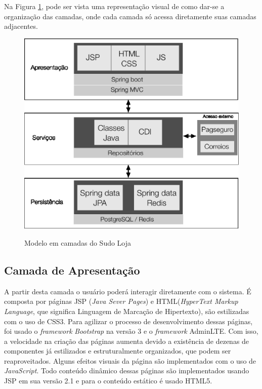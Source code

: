 \documentclass[a4paper,12pt]{monografia}
\begin{document}
Na Figura \ref{fig:representacao-pa}, pode ser vista uma representação visual de como dar-se a organização das camadas, onde cada camada só acessa diretamente suas camadas adjacentes.

\begin{figure}[H]
\centering
\caption{Modelo em camadas do Sudo Loja}
\centering
\includegraphics[scale=0.7]{img/representacao-pa.eps}\\
\label{fig:representacao-pa}
\end{figure}

\subsection{Camada de Apresentação} %
\label{sub:camada_de_apresentacao}

A partir desta camada o usuário poderá interagir diretamente com o sistema. É composta por páginas JSP (\textit{Java Sever Pages}) e HTML(\textit{HyperText Markup Language}, que significa Linguagem de Marcação de Hipertexto), são estilizadas com o uso de CSS3. Para agilizar o processo de desenvolvimento dessas páginas, foi usado o \textit{framework} \textit{Bootstrap} na versão 3 e o \textit{framework} AdminLTE. Com isso, a velocidade na criação das páginas aumenta devido a existência de dezenas de componentes já estilizados e estruturalmente organizados, que podem ser reaproveitados. Alguns efeitos visuais da página são implementados com o uso de \textit{JavaScript}. Todo conteúdo dinâmico dessas páginas são implementados usando JSP em sua versão 2.1 e para o conteúdo estático é usado HTML5.
\end{document}
